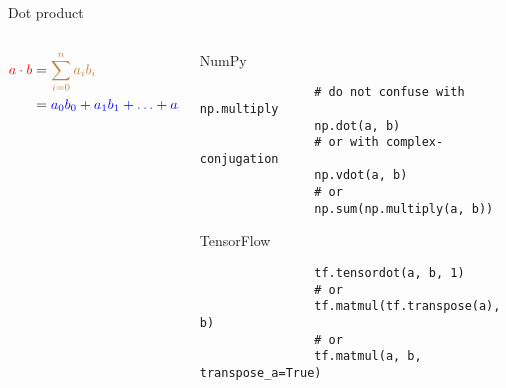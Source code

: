 \documentclass[handout]{beamer}
\begin{document}
\begin{frame}[fragile]{Dot product}
    \begin{columns}
        \begin{column}{0.5\textwidth}
            \large
            \begin{align*}
                \textcolor{red}{a \cdot b} &= \textcolor{brown}{\sum_{i=0}^{n} a_i b_i} \\
                                           &= \textcolor{blue}{a_0b_0 + a_1b_1 + \ldots + a_nb_n}
            \end{align*}
        \end{column}
        \begin{column}{0.5\textwidth}
            \begin{alertblock}{NumPy}
                \begin{lstlisting}
                # do not confuse with np.multiply
                np.dot(a, b)
                # or with complex-conjugation
                np.vdot(a, b)
                # or 
                np.sum(np.multiply(a, b))
                \end{lstlisting}
            \end{alertblock}
            \begin{alertblock}{TensorFlow}
                \begin{lstlisting}
                tf.tensordot(a, b, 1)
                # or
                tf.matmul(tf.transpose(a), b)
                # or
                tf.matmul(a, b, transpose_a=True)
                \end{lstlisting}
            \end{alertblock}
        \end{column}
    \end{columns}
\end{frame}
\end{document}
